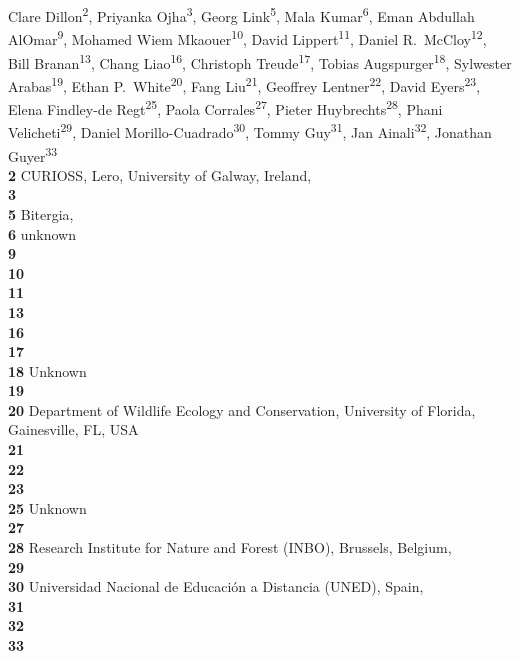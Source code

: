 Clare Dillon\textsuperscript{2},
Priyanka Ojha\textsuperscript{3},
Georg Link\textsuperscript{5},
Mala Kumar\textsuperscript{6},
Eman Abdullah AlOmar\textsuperscript{9},
Mohamed Wiem Mkaouer\textsuperscript{10},
David Lippert\textsuperscript{11},
Daniel R.\ McCloy\textsuperscript{12},
Bill Branan\textsuperscript{13},
Chang Liao\textsuperscript{16},
Christoph Treude\textsuperscript{17},
Tobias Augspurger\textsuperscript{18},
Sylwester Arabas\textsuperscript{19},
Ethan P.\ White\textsuperscript{20},
Fang Liu\textsuperscript{21},
Geoffrey Lentner\textsuperscript{22},
David Eyers\textsuperscript{23},
Elena Findley-de Regt\textsuperscript{25},
Paola Corrales\textsuperscript{27},
Pieter Huybrechts\textsuperscript{28},
Phani Velicheti\textsuperscript{29},
Daniel Morillo-Cuadrado\textsuperscript{30},
Tommy Guy\textsuperscript{31},
Jan Ainali\textsuperscript{32},
Jonathan Guyer\textsuperscript{33}
\\
\bigskip
\textbf{2} CURIOSS, Lero, University of Galway, Ireland, \\
\textbf{3} \\
\textbf{5} Bitergia, \\
\textbf{6} unknown\\
\textbf{9} \\
\textbf{10} \\
\textbf{11} \\
\textbf{13} \\
\textbf{16} \\
\textbf{17} \\
\textbf{18} Unknown\\
\textbf{19} \\
\textbf{20} Department of Wildlife Ecology and Conservation, University of Florida, Gainesville, FL, USA \\
\textbf{21} \\
\textbf{22} \\
\textbf{23} \\
\textbf{25} Unknown\\
\textbf{27} \\
\textbf{28} Research Institute for Nature and Forest (INBO), Brussels, Belgium, \\
\textbf{29} \\
\textbf{30} Universidad Nacional de Educación a Distancia (UNED), Spain, \\
\textbf{31} \\
\textbf{32} \\
\textbf{33} \\
